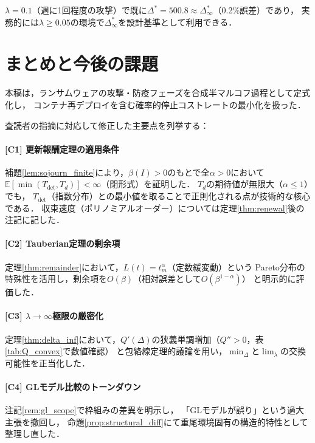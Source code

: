 \documentclass[12pt,a4paper]{article}
\theoremstyle{plain}
\theoremstyle{definition}
\theoremstyle{remark}
\newcommand{\E}{\mathbb{E}}
\newcommand{\Tdet}{T_{\mathrm{det}}}
\newcommand{\betaI}{\beta(I)}
\newcommand{\Dopt}{\Delta^{*}}
\newcommand{\Dinf}{\Delta^{*}_{\infty}}
\begin{document}
$\lambda=0.1$（週に1回程度の攻撃）で既に$\Dopt=500.8\approx\Dinf$（0.2\%誤差）であり，
実務的には$\lambda\ge0.05$の環境で$\Dinf$を設計基準として利用できる．

\section{まとめと今後の課題}
\label{sec:conclusion}

本稿は，ランサムウェアの攻撃・防疫フェーズを合成半マルコフ過程として定式化し，
コンテナ再デプロイを含む確率的停止コストレートの最小化を扱った．

査読者の指摘に対応して修正した主要点を列挙する：

\paragraph{[C1] 更新報酬定理の適用条件}
補題\ref{lem:sojourn_finite}により，$\betaI>0$のもとで全$\alpha>0$において
$\E[\min(\Tdet,T_d)]<\infty$（閉形式）を証明した．
$T_d$の期待値が無限大（$\alpha\le1$）でも，
$\Tdet$（指数分布）との最小値を取ることで正則化される点が技術的な核心である．
収束速度（ポリノミアルオーダー）については定理\ref{thm:renewal}後の注記に記した．

\paragraph{[C2] Tauberian定理の剰余項}
定理\ref{thm:remainder}において，$L(t)=t_m^\alpha$（定数緩変動）という
Pareto分布の特殊性を活用し，剰余項を$O(\beta)$（相対誤差として$O(\beta^{1-\alpha})$）
と明示的に評価した．

\paragraph{[C3] $\lambda\to\infty$極限の厳密化}
定理\ref{thm:delta_inf}において，$Q'(\Delta)$の狭義単調増加（$Q''>0$，表\ref{tab:Q_convex}で数値確認）
と包絡線定理的議論を用い，$\min_\Delta$と$\lim_\lambda$の交換可能性を正当化した．

\paragraph{[C4] GLモデル比較のトーンダウン}
注記\ref{rem:gl_scope}で枠組みの差異を明示し，
「GLモデルが誤り」という過大主張を撤回し，
命題\ref{prop:structural_diff}にて重尾環境固有の構造的特性として整理し直した．
\end{document}
